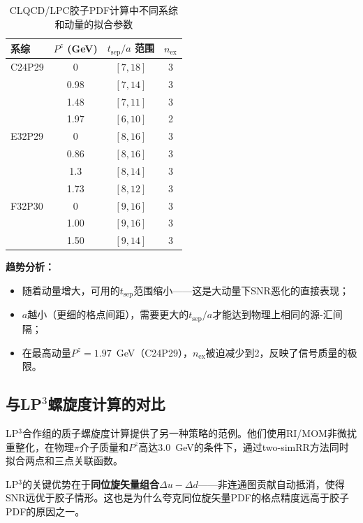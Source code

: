 \documentclass[12pt,a4paper]{ctexart}
\theoremstyle{definition}
\begin{document}
\begin{table}[H]
\centering
\caption{CLQCD/LPC胶子PDF计算中不同系综和动量的拟合参数\cite{Chen2025gluon}}
\label{tab:fitting_params}
\begin{tabular}{lccc}
\toprule
系综 & $P^z$ (GeV) & $t_{\text{sep}}/a$ 范围 & $n_{\text{ex}}$ \\
\midrule
C24P29 & 0     & $[7, 18]$ & 3 \\
        & 0.98  & $[7, 14]$ & 3 \\
        & 1.48  & $[7, 11]$ & 3 \\
        & 1.97  & $[6, 10]$ & 2 \\
\midrule
E32P29 & 0     & $[8, 16]$ & 3 \\
        & 0.86  & $[8, 16]$ & 3 \\
        & 1.3   & $[8, 14]$ & 3 \\
        & 1.73  & $[8, 12]$ & 3 \\
\midrule
F32P30 & 0     & $[9, 16]$ & 3 \\
        & 1.00  & $[9, 16]$ & 3 \\
        & 1.50  & $[9, 14]$ & 3 \\
\bottomrule
\end{tabular}
\end{table}

\textbf{趋势分析：}
\begin{itemize}
    \item 随着动量增大，可用的$t_{\text{sep}}$范围缩小——这是大动量下SNR恶化的直接表现；
    \item $a$越小（更细的格点间距），需要更大的$t_{\text{sep}}/a$才能达到物理上相同的源-汇间隔；
    \item 在最高动量$P^z = 1.97$~GeV（C24P29），$n_{\text{ex}}$被迫减少到2，反映了信号质量的极限。
\end{itemize}

\subsection{与LP$^3$螺旋度计算的对比}

LP$^3$合作组的质子螺旋度计算\cite{LP3helicity}提供了另一种策略的范例。他们使用RI/MOM非微扰重整化，在物理$\pi$介子质量和$P^z$高达3.0~GeV的条件下，通过two-simRR方法同时拟合两点和三点关联函数。

LP$^3$的关键优势在于\textbf{同位旋矢量组合}$\Delta u - \Delta d$——非连通图贡献自动抵消，使得SNR远优于胶子情形。这也是为什么夸克同位旋矢量PDF的格点精度远高于胶子PDF的原因之一。
\end{document}
